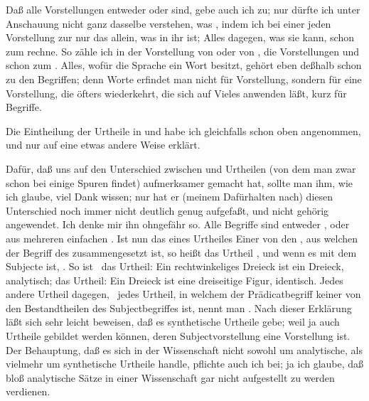 \begin{aufza}
\item Daß alle Vorstellungen entweder  oder  sind, gebe auch ich zu; nur dürfte ich unter Anschauung nicht ganz dasselbe verstehen, was , indem ich bei einer jeden Vorstellung zur  nur das allein, was in ihr  ist; Alles dagegen, was sie  kann, schon zum  rechne. So zähle ich in der Vorstellung von  oder von , die Vorstellungen  und  schon zum . Alles, wofür die Sprache ein Wort besitzt, gehört eben deßhalb schon zu den Begriffen; denn Worte erfindet man nicht für  Vorstellung, sondern für eine Vorstellung, die öfters wiederkehrt, die sich auf Vieles anwenden läßt, kurz für Begriffe.
\item Die Eintheilung der Urtheile in  und  habe ich gleichfalls schon oben angenommen, und nur auf eine etwas andere Weise erklärt.~
\item Dafür, daß uns  auf den Unterschied zwischen  und  Urtheilen (von dem man zwar schon bei  einige Spuren findet) aufmerksamer gemacht hat, sollte man ihm, wie ich glaube, viel Dank wissen; nur hat er (meinem Dafürhalten nach) diesen Unterschied noch immer nicht deutlich genug aufgefaßt, und nicht gehörig angewendet. Ich denke mir ihn ohngefähr so. Alle Begriffe sind entweder , oder aus mehreren einfachen . Ist nun das  eines Urtheiles Einer von den , aus welchen der Begriff des  zusammengesetzt ist, so heißt das Urtheil , und wenn es  mit dem Subjecte ist, . So ist \zB\ das Urtheil: Ein rechtwinkeliges Dreieck ist ein Dreieck, analytisch; das Urtheil: Ein Dreieck ist eine dreiseitige Figur, identisch. Jedes andere Urtheil dagegen, \dh\ jedes Urtheil, in welchem der Prädicatbegriff keiner von den Bestandtheilen des Subjectbegriffes ist, nennt man . Nach dieser Erklärung läßt sich sehr leicht beweisen, daß es synthetische Urtheile gebe; weil ja auch Urtheile gebildet werden können, deren Subjectvorstellung eine  Vorstellung ist. Der Behauptung, daß es sich in der Wissenschaft nicht sowohl um analytische, als vielmehr um synthetische Urtheile handle, pflichte auch ich bei; ja ich glaube, daß bloß analytische Sätze in einer Wissenschaft gar nicht aufgestellt zu werden verdienen.

\end{aufza}
